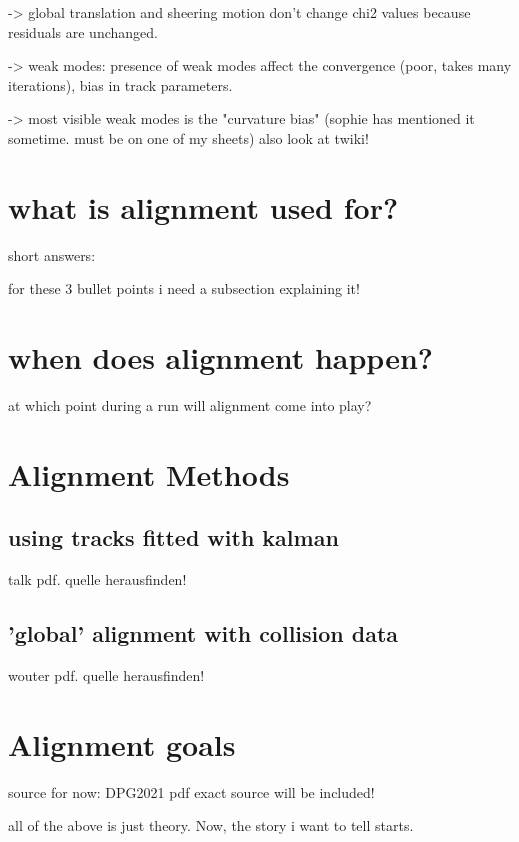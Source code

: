 -> global translation and sheering motion don't change chi2 values because residuals are unchanged.

-> weak modes: presence of weak modes affect the convergence (poor, takes many iterations), bias in track parameters.

-> most visible weak modes is the "curvature bias" (sophie has mentioned it sometime. must be on one of my sheets)
also look at twiki!
\section{what is alignment used for?}
short answers:

for these 3 bullet points i need a subsection explaining it!

\section{when does alignment happen?}
at which point during a run will alignment come into play?

\section{Alignment Methods}

\subsection{using tracks fitted with kalman}
talk pdf. quelle herausfinden!
\subsection{'global' alignment with collision data}
wouter pdf. quelle herausfinden!

\section{Alignment goals}
source for now: DPG2021 pdf exact source will be included!

all of the above is just theory. Now, the story i want to tell starts.
